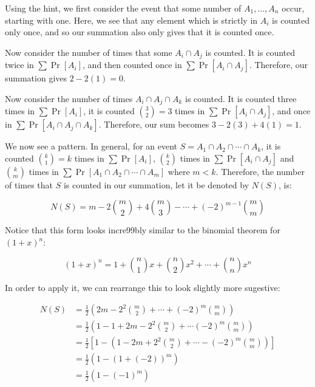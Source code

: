 \documentclass[11pt]{article}
\begin{document}
\begin{solution}
    Using the hint, we first consider the event that some number of $A_1, \dots, A_n$ occur, starting with one. Here, we see that any element which is strictly in $A_i$ is counted only once, and so our summation also only gives that it is counted once. 
    
    Now consider the number of times that some $A_i \cap A_j$ is counted. It is counted twice in $\sum \Pr[A_i]$, and then counted once in $\sum \Pr[A_i \cap A_j]$. Therefore, our summation gives $2 - 2(1) = 0$.
    
    
    Now consider the number of times $A_i \cap A_j \cap A_k$ is counted. It is counted three times in $\sum \Pr[A_i]$, it is counted ${3 \choose 2} = 3$ times in $\sum \Pr[A_i \cap A_j]$, and once in $\sum \Pr[A_i \cap A_j \cap A_k]$. Therefore, our sum becomes $3 - 2(3) + 4(1) = 1$. 

    We now see a pattern. In general, for an event $S = A_1 \cap A_2 \cap \cdots \cap A_k$, it is counted ${k \choose 1} = k$ times in $\sum \Pr[A_i]$, $k \choose 2$ times in $\sum \Pr[A_i \cap A_j]$ and $k \choose m$ times in $\sum \Pr[A_1 \cap A_2 \cap \cdots \cap A_m]$ where $m < k$. Therefore, the number of times that $S$ is counted in our summation, let it be denoted by $N(S)$, is: 

    \[N(S) = m - 2{m \choose 2} + 4 {m \choose 3} - \cdots + (-2)^{m - 1} {m \choose m}\]

    Notice that this form looks incre99bly similar to the binomial theorem for $(1 + x)^n$: 

    \[ (1 + x)^n = 1 + {n \choose 1} x + {n \choose 2} x^2 + \cdots + {n \choose n}x^n\]

    In order to apply it, we can rearrange this to look slightly more sugestive: 


    \begin{align*}
        N(S) &= \frac{1}{2} \left( 2m - 2^2 {m \choose 2} + \cdots + (-2)^m {m \choose m}\right)\\
        &= \frac{1}{2} \left(1 - 1 + 2m - 2^2 {m \choose 2} + \cdots (-2)^m {m \choose m}\right)\\
        &= \frac{1}{2} \left[ 1 -\left(1 - 2m +2^2 {m \choose 2} + \cdots -(-2)^m {m \choose m}\right)\right]\\
        &= \frac 12 \left( 1 - (1 + (-2))^m\right)\\
        &= \frac 12 (1 - (-1)^m)
    \end{align*}


\end{solution}
\end{document}
